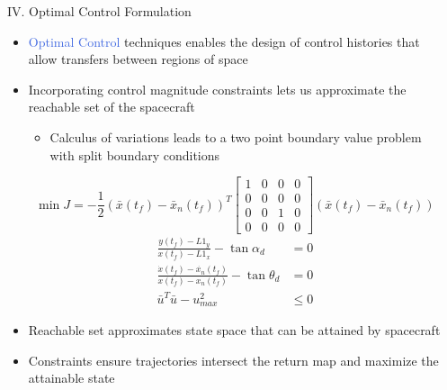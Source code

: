 \documentclass[final, usenames, dvipsnames]{beamer}
\newlength{\onecolwidth}
\newlength{\twocolwidth}
\def\Emph{\textcolor{RoyalBlue}}
\begin{document}
\begin{frame}[t]
\begin{columns}[T,onlytextwidth]
\begin{column}{\twocolwidth}
\begin{block}{IV. Optimal Control Formulation}
\begin{itemize}
\begin{figure}
\begin{subfigure}[b]{0.24\columnwidth}
                \caption*{U4 Poincar\'e}
                \label{fig:u4_poincare}
        	\end{subfigure}
			\label{fig:poincare_sections}
		\end{figure}
		\item \Emph{Optimal Control} techniques enables the design of control histories that allow transfers between regions of space
		\item Incorporating control magnitude constraints lets us approximate the reachable set of the spacecraft
			\begin{itemize}
				\item Calculus of variations leads to a two point boundary value problem with split boundary conditions
			\end{itemize}
			\begin{multicols}{2}
			\begin{equation*}
				\min J = -\frac{1}{2} \left( \bar{x}(t_f) - \bar{x}_{n}(t_f)\right)^T 
				\left[
					\begin{array}{cccc}
            		1 & 0& 0& 0 \\
            		 0& 0& 0& 0\\
            		 0 & 0 & 1 &0\\
            		 0 & 0& 0& 0
            	\end{array}
            	\right]
            	\left( \bar{x}(t_f) - \bar{x}_{n}(t_f)\right)
            	\label{eq:cost}
			\end{equation*}\break	
            \begin{align*}
            	 \frac{y(t_f) - L1_y}{x(t_f) - L1_x} - \tan{\alpha_d} &= 0\\ 
            	 \frac{\dot{x}(t_f) - \dot{x_n}(t_f) }{x(t_f) -x_n(t_f) } - \tan{\theta_d} &= 0\\
				 \bar{u}^T \bar{u} - u_{max}^2 &\leq 0
            	\label{eq:constraint}
            \end{align*}
			\end{multicols}
		\item Reachable set approximates state space that can be attained by spacecraft 
		\item Constraints ensure trajectories intersect the return map and maximize the attainable state
	\end{itemize}
\end{block} %
\end{column}


\begin{column}{\onecolwidth} %


\end{column}
\end{columns}
\end{frame}
\end{document}

